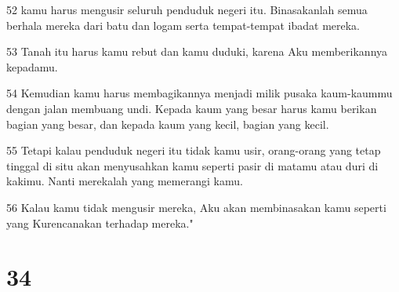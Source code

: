 \par 52 kamu harus mengusir seluruh penduduk negeri itu. Binasakanlah semua berhala mereka dari batu dan logam serta tempat-tempat ibadat mereka.
\par 53 Tanah itu harus kamu rebut dan kamu duduki, karena Aku memberikannya kepadamu.
\par 54 Kemudian kamu harus membagikannya menjadi milik pusaka kaum-kaummu dengan jalan membuang undi. Kepada kaum yang besar harus kamu berikan bagian yang besar, dan kepada kaum yang kecil, bagian yang kecil.
\par 55 Tetapi kalau penduduk negeri itu tidak kamu usir, orang-orang yang tetap tinggal di situ akan menyusahkan kamu seperti pasir di matamu atau duri di kakimu. Nanti merekalah yang memerangi kamu.
\par 56 Kalau kamu tidak mengusir mereka, Aku akan membinasakan kamu seperti yang Kurencanakan terhadap mereka."

\chapter{34}

